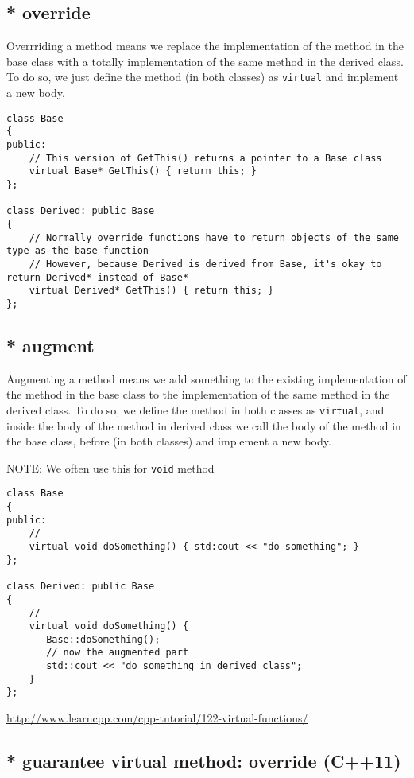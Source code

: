 \subsection{* override}
\label{sec:virtual_member-function-override}

Overrriding a method means we replace the implementation of the method in the
base class with a totally implementation of the same method in the derived
class. To do so, we just define the method (in both classes) as \verb!virtual!
and implement a new body.

\begin{lstlisting}
class Base
{
public:
    // This version of GetThis() returns a pointer to a Base class
    virtual Base* GetThis() { return this; }
};
 
class Derived: public Base
{
    // Normally override functions have to return objects of the same type as the base function
    // However, because Derived is derived from Base, it's okay to return Derived* instead of Base*
    virtual Derived* GetThis() { return this; }
};
\end{lstlisting}

\subsection{* augment}
\label{sec:virtual_member-function-augment}

Augmenting a method means we add something to the existing implementation of the
method in the base class to the implementation of the same method in the derived
class. To do so, we define the method in both classes as \verb!virtual!, and
inside the body of the method in derived class we call the body of the 
method in the base class, before (in both classes) and implement a new body.

NOTE: We often use this for \verb!void! method
\begin{lstlisting}
class Base
{
public:
    // 
    virtual void doSomething() { std:cout << "do something"; }
};
 
class Derived: public Base
{
    // 
    virtual void doSomething() { 
       Base::doSomething();
       // now the augmented part
       std::cout << "do something in derived class";
    }
};

\end{lstlisting}
\url{http://www.learncpp.com/cpp-tutorial/122-virtual-functions/}

\subsection{* guarantee virtual method: override (C++11)}
\label{sec:C++11_override}

